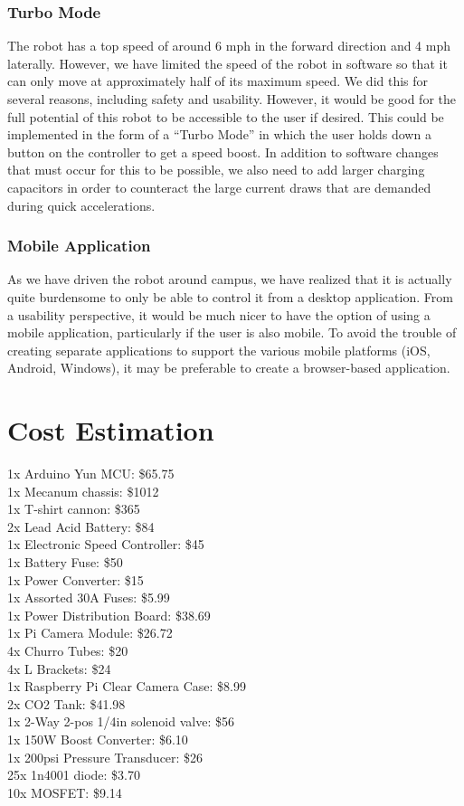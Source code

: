 \documentclass[letterpaper,12pt]{article}
\begin{document}
\subsubsection{Turbo Mode}
The robot has a top speed of around 6 mph in the forward direction and 4 mph
laterally. However, we have limited the speed of the robot in software so that
it can only move at approximately half of its maximum speed. We did this for
several reasons, including safety and usability. However, it would be good for
the full potential of this robot to be accessible to the user if desired. This
could be implemented in the form of a ``Turbo Mode'' in which the user holds
down a button on the controller to get a speed boost. In addition to software
changes that must occur for this to be possible, we also need to add larger
charging capacitors in order to counteract the large current draws that are
demanded during quick accelerations.

\subsubsection{Mobile Application}
As we have driven the robot around campus, we have realized that it is actually
quite burdensome to only be able to control it from a desktop application. From
a usability perspective, it would be much nicer to have the option of using a
mobile application, particularly if the user is also mobile. To avoid the
trouble of creating separate applications to support the various mobile
platforms (iOS, Android, Windows), it may be preferable to create a
browser-based application.

\section{Cost Estimation}

\label{sec:cost}
1x Arduino Yun MCU: \$65.75 \\
1x Mecanum chassis: \$1012 \\
1x T-shirt cannon: \$365 \\
2x Lead Acid Battery: \$84 \\
1x Electronic Speed Controller: \$45 \\
1x Battery Fuse: \$50 \\
1x Power Converter: \$15 \\
1x Assorted 30A Fuses: \$5.99 \\
1x Power Distribution Board: \$38.69 \\
1x Pi Camera Module: \$26.72 \\
4x Churro Tubes: \$20 \\
4x L Brackets: \$24 \\
1x Raspberry Pi Clear Camera Case: \$8.99 \\
2x CO2 Tank: \$41.98 \\
1x 2-Way 2-pos 1/4in solenoid valve: \$56 \\
1x 150W Boost Converter: \$6.10 \\
1x 200psi Pressure Transducer: \$26 \\
25x 1n4001 diode: \$3.70 \\
10x MOSFET: \$9.14 \\
\end{document}
